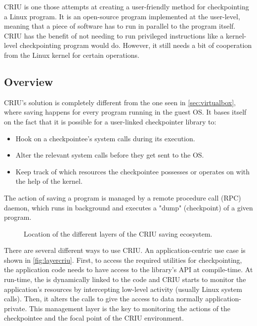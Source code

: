 \gls{CRIU} is one those attempts at creating a user-friendly method for checkpointing a Linux program. It is an open-source program \cite{online:criucode} implemented at the user-level, meaning that a piece of software has to run in parallel to the program itself. CRIU has the benefit of not needing to run privileged instructions like a kernel-level checkpointing program would do. However, it still needs a bit of cooperation from the Linux kernel for certain operations.

\subsection*{Overview}
\gls{CRIU}'s solution is completely different from the one seen in \autoref{sec:virtualbox}, where saving happens for every program running in the guest OS. It bases itself on the fact that it is possible for a user-linked checkpointer library to:
\begin{itemize}
	\item Hook on a checkpointee's system calls during its execution.
	\item Alter the relevant system calls before they get sent to the OS.
	\item Keep track of which resources the checkpointee possesses or operates on with the help of the kernel.
\end{itemize}
The action of saving a program is managed by a remote procedure call (RPC) daemon, which runs in background and executes a "dump" (checkpoint) of a given program. 
\begin{figure}[htbp]
	\centering \small
	
	\caption{Location of the different layers of the CRIU saving ecosystem.}
	\label{fig:layercriu}
\end{figure}

There are several different ways to use \gls{CRIU}. An application-centric use case is shown in \autoref{fig:layercriu}. First, to access the required utilities for checkpointing, the application code needs to have access to the library's API at compile-time. At run-time, the  is dynamically linked to the code and CRIU starts to monitor the application's resources by intercepting low-level activity (usually Linux system calls). Then, it alters the calls to give the access to data normally application-private. This management layer is the key to monitoring the actions of the checkpointee and the focal point of the CRIU environment.

